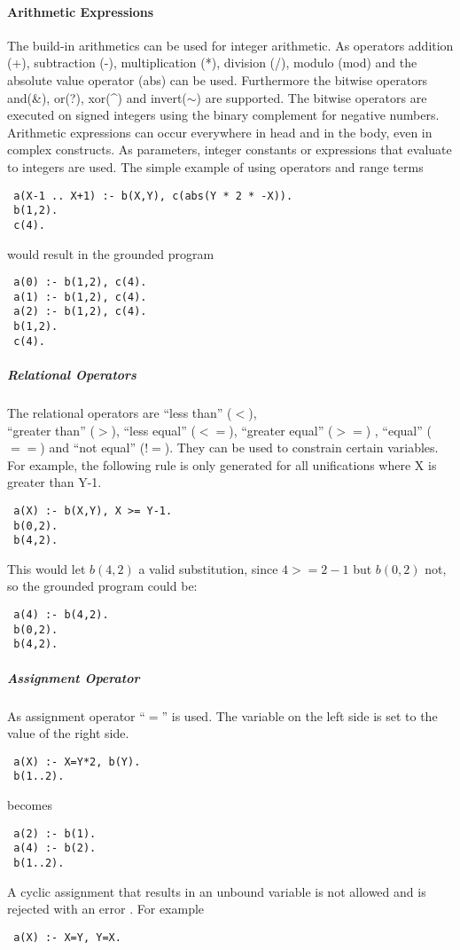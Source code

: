 \documentclass[a4paper,10pt]{article}
\begin{document}
\paragraph{Arithmetic Expressions}
The build-in arithmetics can be used for integer arithmetic.
As operators addition (+), subtraction (-), multiplication (*), division (/), modulo (mod) and the absolute value operator (abs) can be used.
Furthermore the bitwise operators and(\&), or(?), xor(\textasciicircum) and invert($\sim$) are supported. The bitwise operators are executed on signed integers using the binary complement for negative numbers.
Arithmetic expressions can occur everywhere in head and in the body, even in complex constructs.
As parameters, integer constants or expressions that evaluate to integers are used.
The simple example of using operators and range terms
\begin{verbatim}
 a(X-1 .. X+1) :- b(X,Y), c(abs(Y * 2 * -X)).
 b(1,2).
 c(4).
\end{verbatim}
would result in the grounded program
\begin{verbatim}
 a(0) :- b(1,2), c(4).
 a(1) :- b(1,2), c(4).
 a(2) :- b(1,2), c(4).
 b(1,2).
 c(4).
\end{verbatim}

\subparagraph{Relational Operators}
The relational operators are ``less than'' ($<$),\\ ``greater than'' ($>$), ``less equal'' ($<=$), ``greater equal'' ($>=$) , ``equal'' ($==$) and ``not equal'' ($!=$).
They can be used to constrain certain variables.
For example, the following rule is only generated for all unifications where X is greater than Y-1.
\begin{verbatim}
 a(X) :- b(X,Y), X >= Y-1.
 b(0,2).
 b(4,2).
\end{verbatim}
This would let $b(4,2)$ a valid substitution, since $4 >= 2-1$ but $b(0,2)$ not, so the grounded program could be:
\begin{verbatim}
 a(4) :- b(4,2).
 b(0,2).
 b(4,2).
\end{verbatim}

\subparagraph{Assignment Operator}
As assignment operator ``$=$'' is used.
The variable on the left side is set to the value of the right side.
\begin{verbatim}
 a(X) :- X=Y*2, b(Y).
 b(1..2).
\end{verbatim}
becomes
\begin{verbatim}
 a(2) :- b(1).
 a(4) :- b(2).
 b(1..2).
\end{verbatim}
A cyclic assignment that results in an unbound variable is not allowed and is rejected with an error . For example
\begin{verbatim}
 a(X) :- X=Y, Y=X.
\end{verbatim}
\end{document}
